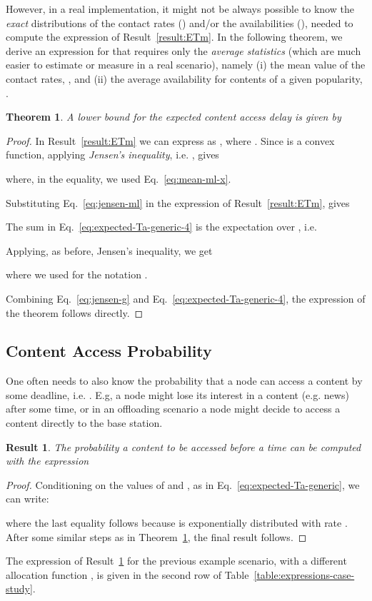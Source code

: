 \documentclass[journal]{IEEEtran}
\newtheorem{theorem}{Theorem}\newtheorem{definition}{Definition}
\newtheorem{result}{Result}
\newcommand{\eq}[1]{Eq.~\eqref{#1}}
\begin{document}
However, in a real implementation, it might not be always possible to know the \textit{exact} distributions of the contact rates () and/or the availabilities (), needed to compute the expression of Result~\ref{result:ETm}. In the following theorem, we derive an expression for  that requires only the \textit{average statistics} (which are much easier to estimate or measure in a real scenario), namely (i) the mean value of the contact rates, , and (ii) the average availability for contents of a given popularity, . 
\begin{theorem}\label{thm:lower-bound-ETm}
A lower bound for the expected content access delay is given by

\end{theorem}
\begin{proof}
In Result~\ref{result:ETm} we can express  as , where . Since  is a convex function, applying \emph{Jensen's inequality}, i.e. , gives

where, in the equality, we used \eq{eq:mean-ml-x}.

Substituting \eq{eq:jensen-ml} in the expression of Result~\ref{result:ETm}, gives

The sum in \eq{eq:expected-Ta-generic-4} is the expectation over , i.e.

Applying, as before, Jensen's inequality, we get

where we used for  the notation .

Combining \eq{eq:jensen-g} and \eq{eq:expected-Ta-generic-4}, the expression of the theorem follows directly.
\end{proof}



\subsection*{\textbf{Content Access Probability}}

One often needs to also know the probability that a node can access a content by some deadline, i.e. . E.g, a node might lose its interest in a content (e.g. news) after some time, or in an offloading scenario a node might decide to access a content directly to the base station. 
\begin{result}\label{result:P-Tm-TTL}
The probability a content to be accessed before a time  can be computed with the expression

\end{result}
\begin{proof}
Conditioning on the values of  and , as in \eq{eq:expected-Ta-generic}, we can write:
\begin{small}

\end{small}
where the last equality follows because  is exponentially distributed with rate . After some similar steps as in Theorem~\ref{thm:lower-bound-ETm}, the final result follows.
\end{proof}
The expression of Result~\ref{result:P-Tm-TTL} for the previous example scenario, with a different allocation function , is given in the second row of Table~\ref{table:expressions-case-study}.
\end{document}
